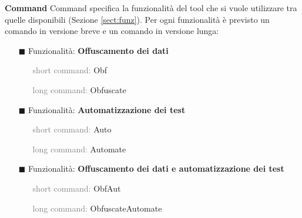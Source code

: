\bigskip
\noindent\textbf{Command} \newline
Command specifica la funzionalità del tool che si vuole utilizzare tra quelle disponibili (Sezione \ref{sect:funz}). Per ogni funzionalità è previsto un comando in versione breve e un comando in versione lunga:
\begin{itemize}[nosep]
\item [$\blacksquare$] Funzionalità: \textbf{Offuscamento dei dati}
\begin{itemize}[nosep]
\item [] \textcolor{gray}{short command:} Obf
\item [] \textcolor{gray}{long command:} Obfuscate
\end{itemize}
\item [$\blacksquare$] Funzionalità: \textbf{Automatizzazione dei test}
\begin{itemize}[nosep]
\item [] \textcolor{gray}{short command:} Auto
\item [] \textcolor{gray}{long command:} Automate
\end{itemize}
\item [$\blacksquare$] Funzionalità: \textbf{Offuscamento dei dati e automatizzazione dei test}
\begin{itemize}[nosep]
\item [] \textcolor{gray}{short command:} ObfAut
\item [] \textcolor{gray}{long command:} ObfuscateAutomate
\end{itemize}
\end{itemize}

